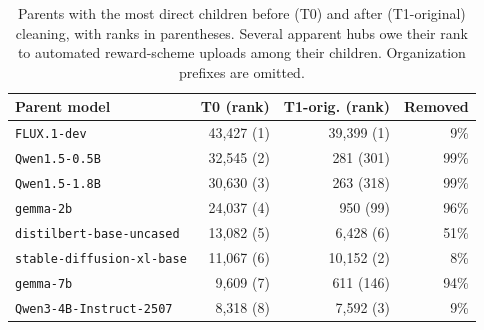 \begin{table}[t]
\centering
\footnotesize
\setlength{\tabcolsep}{2pt}
\caption{Parents with the most direct children before (T0) and after (T1-original) cleaning, with ranks in parentheses. Several apparent hubs owe their rank to automated reward-scheme uploads among their children. Organization prefixes are omitted.}
\label{tab:cleaning}
\begin{tabular}{lrrr}
\toprule
Parent model & T0 (rank) & T1-orig. (rank) & Removed \\
\midrule
\texttt{FLUX.1-dev} & 43,427 (1) & 39,399 (1) & 9\% \\
\texttt{Qwen1.5-0.5B} & 32,545 (2) & 281 (301) & 99\% \\
\texttt{Qwen1.5-1.8B} & 30,630 (3) & 263 (318) & 99\% \\
\texttt{gemma-2b} & 24,037 (4) & 950 (99) & 96\% \\
\texttt{distilbert-base-uncased} & 13,082 (5) & 6,428 (6) & 51\% \\
\texttt{stable-diffusion-xl-base} & 11,067 (6) & 10,152 (2) & 8\% \\
\texttt{gemma-7b} & 9,609 (7) & 611 (146) & 94\% \\
\texttt{Qwen3-4B-Instruct-2507} & 8,318 (8) & 7,592 (3) & 9\% \\
\bottomrule
\end{tabular}
\end{table}

